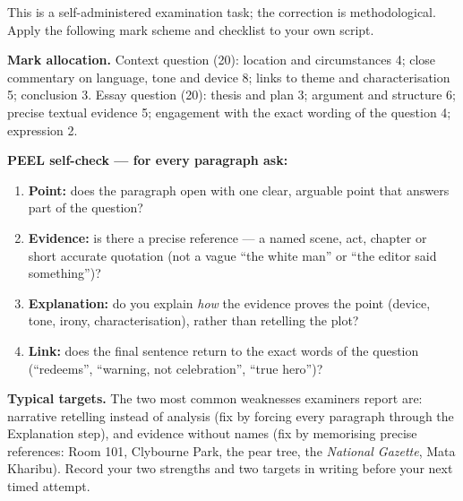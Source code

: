 \documentclass[11pt]{article}
\begin{document}
\begin{corrige}
This is a self-administered examination task; the correction is methodological. Apply the following mark scheme and checklist to your own script.

\textbf{Mark allocation.} Context question (20): location and circumstances 4; close commentary on language, tone and device 8; links to theme and characterisation 5; conclusion 3. Essay question (20): thesis and plan 3; argument and structure 6; precise textual evidence 5; engagement with the exact wording of the question 4; expression 2.

\textbf{PEEL self-check --- for every paragraph ask:}
\begin{enumerate}
\item \textbf{Point:} does the paragraph open with one clear, arguable point that answers part of the question?
\item \textbf{Evidence:} is there a precise reference --- a named scene, act, chapter or short accurate quotation (not a vague ``the white man'' or ``the editor said something'')?
\item \textbf{Explanation:} do you explain \emph{how} the evidence proves the point (device, tone, irony, characterisation), rather than retelling the plot?
\item \textbf{Link:} does the final sentence return to the exact words of the question (``redeems'', ``warning, not celebration'', ``true hero'')?
\end{enumerate}

\textbf{Typical targets.} The two most common weaknesses examiners report are: narrative retelling instead of analysis (fix by forcing every paragraph through the Explanation step), and evidence without names (fix by memorising precise references: Room 101, Clybourne Park, the pear tree, the \emph{National Gazette}, Mata Kharibu). Record your two strengths and two targets in writing before your next timed attempt.
\end{corrige}
\end{document}

